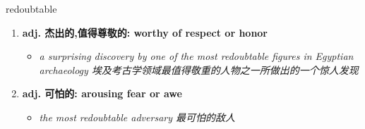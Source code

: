 
\begin{frame}
{\huge redoubtable}
\begin{center}
\begin{enumerate}\Large
  \item \textbf{adj. 杰出的,值得尊敬的: worthy of respect or honor}
  \begin{itemize}
    \item \em{\Large{a surprising discovery by one of the most redoubtable figures in Egyptian archaeology 埃及考古学领域最值得敬重的人物之一所做出的一个惊人发现}}
  \end{itemize}
  \item \textbf{adj. 可怕的: arousing fear or awe}
  \begin{itemize}
    \item \em{\Large{the most redoubtable adversary 最可怕的敌人}}
  \end{itemize}
\end{enumerate}
\end{center}
\end{frame}
